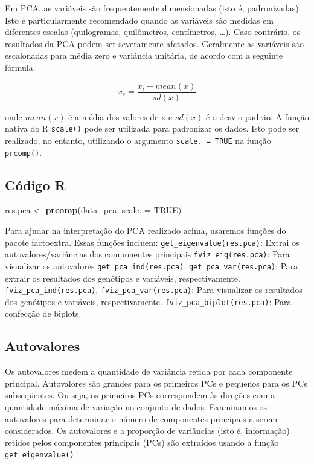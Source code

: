 \documentclass[
]{book}
\newenvironment{Shaded}{\begin{snugshade}}{\end{snugshade}}
\newcommand{\DataTypeTok}[1]{\textcolor[rgb]{0.13,0.29,0.53}{#1}}
\newcommand{\KeywordTok}[1]{\textcolor[rgb]{0.13,0.29,0.53}{\textbf{#1}}}
\newcommand{\NormalTok}[1]{#1}
\newcommand{\OtherTok}[1]{\textcolor[rgb]{0.56,0.35,0.01}{#1}}
\newcommand{\StringTok}[1]{\textcolor[rgb]{0.31,0.60,0.02}{#1}}
\numberwithin{equation}{section}
\begin{document}
Em PCA, as variáveis são frequentemente dimensionadas (isto é, padronizadas). Isto é particularmente recomendado quando as variáveis são medidas em diferentes escalas (quilogramas, quilômetros, centímetros, \ldots). Caso contrário, os resultados da PCA podem ser severamente afetados. Geralmente as variáveis são escalonadas para média zero e variáncia unitária, de acordo com a seguinte fórmula.

\[
x_s = \frac{x_i- mean(x)}{sd(x)}
\]

onde \(mean(x)\) é a média dos valores de x e \(sd(x)\) é o desvio padrão. A função nativa do R \texttt{scale()} pode ser utilizada para padronizar os dados. Isto pode ser realizado, no entanto, utilizando o argumento \texttt{scale.\ =\ TRUE} na função \texttt{prcomp()}.

\hypertarget{cuxf3digo-r}{%
\subsection{Código R}\label{cuxf3digo-r}}

\begin{Shaded}
\begin{Highlighting}[]
\NormalTok{res.pca \textless{}{-}}\StringTok{ }\KeywordTok{prcomp}\NormalTok{(data\_pca, }\DataTypeTok{scale. =} \OtherTok{TRUE}\NormalTok{)}
\end{Highlighting}
\end{Shaded}

Para ajudar na interpretação do PCA realizado acima, usaremos funções do pacote factoextra. Essas funções incluem:
\texttt{get\_eigenvalue(res.pca)}: Extrai os autovalores/variâncias dos componentes principais
\texttt{fviz\_eig(res.pca)}: Para visualizar os autovalores
\texttt{get\_pca\_ind(res.pca)}, \texttt{get\_pca\_var(res.pca)}: Para extrair os resultados dos genótipos e variáveis, respectivamente.
\texttt{fviz\_pca\_ind(res.pca)}, \texttt{fviz\_pca\_var(res.pca)}: Para visualizar os resultados dos genótipos e variáveis, respectivamente.
\texttt{fviz\_pca\_biplot(res.pca)}: Para confecção de biplots.

\hypertarget{autovalores}{%
\subsection{Autovalores}\label{autovalores}}

Os autovalores medem a quantidade de variância retida por cada componente principal. Autovalores são grandes para os primeiros PCs e pequenos para os PCs subseqüentes. Ou seja, os primeiros PCs correspondem às direções com a quantidade máxima de variação no conjunto de dados. Examinamos os autovalores para determinar o número de componentes principais a serem considerados. Os autovalores e a proporção de variâncias (isto é, informação) retidos pelos componentes principais (PCs) são extraídos usando a função \texttt{get\_eigenvalue()}.
\end{document}
